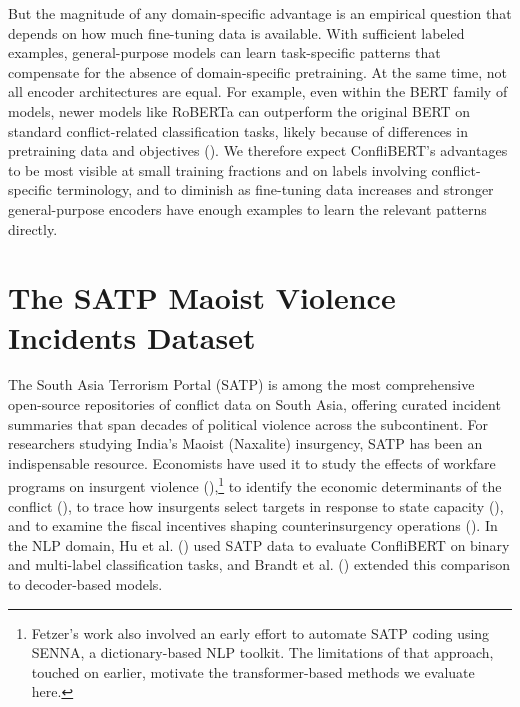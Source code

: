 \documentclass[
  11pt,
]{article}
\begin{document}
But the magnitude of any domain-specific advantage is an empirical
question that depends on how much fine-tuning data is available. With
sufficient labeled examples, general-purpose models can learn
task-specific patterns that compensate for the absence of
domain-specific pretraining. At the same time, not all encoder
architectures are equal. For example, even within the BERT family of
models, newer models like RoBERTa can outperform the original BERT on
standard conflict-related classification tasks, likely because of
differences in pretraining data and objectives
(). We therefore expect
ConfliBERT's advantages to be most visible at small training fractions
and on labels involving conflict-specific terminology, and to diminish
as fine-tuning data increases and stronger general-purpose encoders have
enough examples to learn the relevant patterns directly.

\section{The SATP Maoist Violence Incidents
Dataset}\label{the-satp-maoist-violence-incidents-dataset}

The South Asia Terrorism Portal (SATP) is among the most comprehensive
open-source repositories of conflict data on South Asia, offering
curated incident summaries that span decades of political violence
across the subcontinent. For researchers studying India's Maoist
(Naxalite) insurgency, SATP has been an indispensable resource.
Economists have used it to study the effects of workfare programs on
insurgent violence (),\footnote{Fetzer's
  work also involved an early effort to automate SATP coding using
  SENNA, a dictionary-based NLP toolkit. The limitations of that
  approach, touched on earlier, motivate the transformer-based methods
  we evaluate here.} to identify the economic determinants of the
conflict (), to trace
how insurgents select targets in response to state capacity
(), and to examine the
fiscal incentives shaping counterinsurgency operations
(). In the NLP
domain, Hu et al. () used SATP data to
evaluate ConfliBERT on binary and multi-label classification tasks, and
Brandt et al. () extended this comparison
to decoder-based models.
\end{document}
